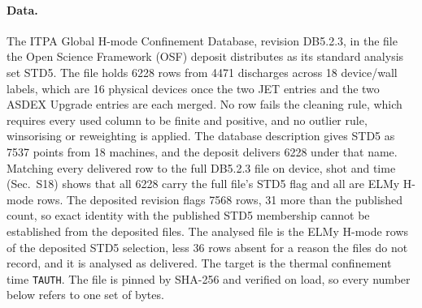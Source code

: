 \documentclass[aip,pop,preprint,amsmath,amssymb]{revtex4-2}
\begin{document}
\paragraph{Data.} The ITPA Global H-mode Confinement Database, revision
DB5.2.3\cite{hdb5}, in the file the Open Science Framework (OSF)
deposit\cite{osfdb} distributes as its standard analysis set STD5. The file
holds 6228 rows from 4471
discharges across 18 device/wall labels, which are 16 physical devices once the
two JET entries and the two ASDEX Upgrade entries are each merged. No row fails
the cleaning rule, which requires every used column to be finite and positive,
and no outlier rule, winsorising or reweighting is applied. The database
description gives STD5 as 7537 points from 18 machines, and the deposit
delivers 6228 under that name. Matching every delivered row to the full
DB5.2.3 file on device, shot and time (Sec.~S18) shows that all 6228 carry
the full file's STD5 flag and all are ELMy H-mode rows. The deposited
revision flags 7568 rows, 31 more than the published count, so exact identity
with the published STD5 membership cannot be established from the deposited
files. The analysed file is the ELMy H-mode rows of the deposited STD5
selection, less 36 rows absent for a reason the files do not record, and it
is analysed as delivered. The target is the
thermal confinement time \texttt{TAUTH}. The file is pinned by SHA-256 and
verified on load, so every number below refers to one set of bytes.
\end{document}
